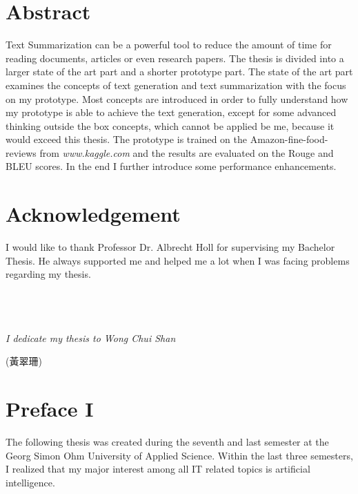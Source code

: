 \thispagestyle{empty}

\section*{Abstract}
\label{sec:abstract}

Text Summarization can be a powerful tool to reduce the amount of time for reading documents, articles or even research papers. The thesis is divided into a larger state of the art part and a shorter prototype part. The state of the art part examines the concepts of text generation and text summarization with the focus on my prototype. Most concepts are introduced in order to fully understand how my prototype is able to achieve the text generation, except for some advanced thinking outside the box concepts, which cannot be applied be me, because it would exceed this thesis. The prototype is trained on the Amazon-fine-food-reviews from \textit{www.kaggle.com} and the results are evaluated on the Rouge and BLEU scores. In the end I further introduce some performance enhancements.

\null\newpage

\section*{Acknowledgement}

I would like to thank Professor Dr. Albrecht Holl for supervising my Bachelor Thesis. He always supported me and helped me a lot when I was facing problems regarding my thesis. \\ \\ \\ \\

\begin{center}
\LARGE{\textit{I dedicate my thesis to Wong Chui Shan} 
\begin{CJK*}{UTF8}{bsmi} 
	(黃翠珊)
\end{CJK*}
}
\end{center}
\null\newpage

\section*{Preface I}
\label{sec:prolog_1}

The following thesis was created during the seventh and last semester at the Georg Simon Ohm University of Applied Science. 
Within the last three semesters, I realized that my major interest among all IT related topics is artificial intelligence.

